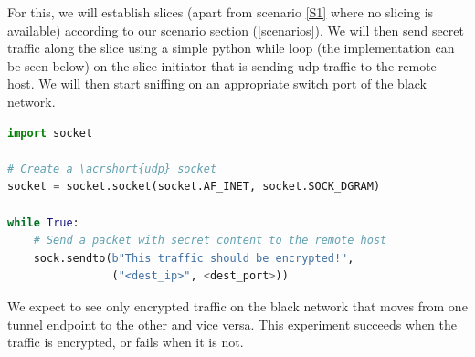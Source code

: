 \begin{description}[style=multiline, labelwidth=0.7cm]
    For this, we will establish slices (apart from scenario \ref{S1} where no slicing is available) according to our scenario section (\ref{scenarios}). We will then send secret traffic along the slice using a simple python while loop (the implementation can be seen below) on the slice initiator that is sending \acrshort{udp} traffic to the remote host. We will then start sniffing on an appropriate switch port of the black network.

\begin{lstlisting}[language=python]
import socket

# Create a \acrshort{udp} socket
socket = socket.socket(socket.AF_INET, socket.SOCK_DGRAM)

while True:
    # Send a packet with secret content to the remote host
    sock.sendto(b"This traffic should be encrypted!",
                ("<dest_ip>", <dest_port>))
\end{lstlisting}

    We expect to see only encrypted traffic on the black network that moves from one tunnel endpoint to the other and vice versa. This experiment succeeds when the traffic is encrypted, or fails when it is not.






\end{description}

